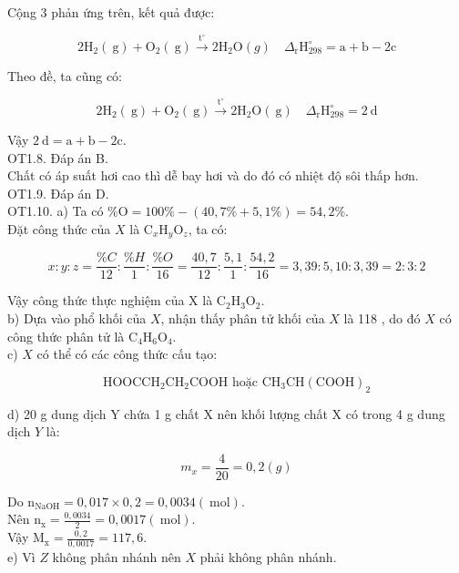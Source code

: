 \documentclass[10pt]{article}
\begin{document}
Cộng 3 phản ứng trên, kết quả được:

$$
2 \mathrm{H}_{2}(\mathrm{~g})+\mathrm{O}_{2}(\mathrm{~g}) \xrightarrow{\mathrm{t}^{\circ}} 2 \mathrm{H}_{2} \mathrm{O}(g) \quad \Delta_{\mathrm{r}} \mathrm{H}_{298}^{\circ}=\mathrm{a}+\mathrm{b}-2 \mathrm{c}
$$

Theo đề, ta cũng có:

$$
2 \mathrm{H}_{2}(\mathrm{~g})+\mathrm{O}_{2}(\mathrm{~g}) \xrightarrow{\mathrm{t}^{\circ}} 2 \mathrm{H}_{2} \mathrm{O}(\mathrm{~g}) \quad \Delta_{\mathrm{r}} \mathrm{H}_{298}^{\circ}=2 \mathrm{~d}
$$

Vậy $2 \mathrm{~d}=\mathrm{a}+\mathrm{b}-2 \mathrm{c}$.\\
OT1.8. Đáp án B.\\
Chất có áp suất hơi cao thì dễ bay hơi và do đó có nhiệt độ sôi thấp hơn.\\
OT1.9. Đáp án D.\\
OT1.10. a) Ta có $\% \mathrm{O}=100 \%-(40,7 \%+5,1 \%)=54,2 \%$.\\
Đặt công thức của $X$ là $\mathrm{C}_{x} \mathrm{H}_{y} \mathrm{O}_{z}$, ta có:

$$
x: y: z=\frac{\% C}{12}: \frac{\% H}{1}: \frac{\% O}{16}=\frac{40,7}{12}: \frac{5,1}{1}: \frac{54,2}{16}=3,39: 5,10: 3,39=2: 3: 2
$$

Vậy công thức thực nghiệm của X là $\mathrm{C}_{2} \mathrm{H}_{3} \mathrm{O}_{2}$.\\
b) Dựa vào phổ khối của $X$, nhận thấy phân tử khối của $X$ là 118 , do đó $X$ có công thức phân tử là $\mathrm{C}_{4} \mathrm{H}_{6} \mathrm{O}_{4}$.\\
c) $X$ có thể có các công thức cấu tạo:

$$
\mathrm{HOOCCH}_{2} \mathrm{CH}_{2} \mathrm{COOH} \text { hoặc } \mathrm{CH}_{3} \mathrm{CH}(\mathrm{COOH})_{2}
$$

d) 20 g dung dịch Y chứa 1 g chất X nên khối lượng chất X có trong 4 g dung dịch $Y$ là:

$$
m_{x}=\frac{4}{20}=0,2(g)
$$

Do $\mathrm{n}_{\mathrm{NaOH}}=0,017 \times 0,2=0,0034(\mathrm{~mol})$.\\
Nên $\mathrm{n}_{\mathrm{x}}=\frac{0,0034}{2}=0,0017(\mathrm{~mol})$.\\
Vậy $\mathrm{M}_{\mathrm{x}}=\frac{0,2}{0,0017}=117,6$.\\
e) Vì $Z$ không phân nhánh nên $X$ phải không phân nhánh.
\end{document}

